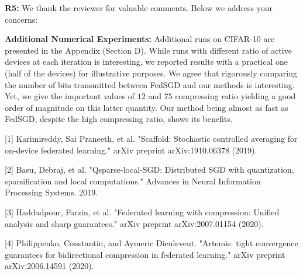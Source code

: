\documentclass{article}
\begin{document}
\textbf{\textcolor{green!50!black}{R5:}} We thank the reviewer for valuable comments. Below we address your concerns:\vspace{-5pt}

\textbf{Additional Numerical Experiments:} Additional runs on CIFAR-10 are presented in the Appendix (Section D). While runs with different ratio of active devices at each iteration is interesting, we reported results with a practical one (half of the devices) for illustrative purposes.
We agree that rigorously comparing the number of bits transmitted between FedSGD and our methods is interesting.
Yet, we give the important values of $12$ and $75$ compressing ratio yielding a good order of magnitude on this latter quantity. Our method being almost as fast as FedSGD, despite the high compressing ratio, shows its benefits.

[1] Karimireddy, Sai Praneeth, et al. "Scaffold: Stochastic controlled averaging for on-device federated learning." arXiv preprint arXiv:1910.06378 (2019).\vspace{-1.8pt} 

[2] Basu, Debraj, et al. "Qsparse-local-SGD: Distributed SGD with quantization, sparsification and local computations." Advances in Neural Information Processing Systems. 2019.\vspace{-1.8pt} 

[3] Haddadpour, Farzin, et al. "Federated learning with compression: Unified analysis and sharp guarantees." arXiv preprint arXiv:2007.01154 (2020).\vspace{-1.8pt} 

[4] Philippenko, Constantin, and Aymeric Dieuleveut. "Artemis: tight convergence guarantees for bidirectional compression in federated learning." arXiv preprint arXiv:2006.14591 (2020).
\end{document}
